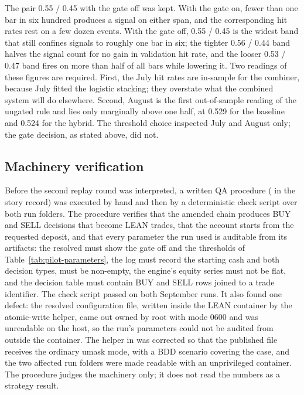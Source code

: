 The pair 0.55 / 0.45 with the gate off was kept. With the gate on, fewer than one bar in six hundred produces a signal on either span, and the corresponding hit rates rest on a few dozen events. With the gate off, 0.55 / 0.45 is the widest band that still confines signals to roughly one bar in six; the tighter 0.56 / 0.44 band halves the signal count for no gain in validation hit rate, and the looser 0.53 / 0.47 band fires on more than half of all bars while lowering it. Two readings of these figures are required. First, the July hit rates are in-sample for the combiner, because July fitted the logistic stacking; they overstate what the combined system will do elsewhere. Second, August is the first out-of-sample reading of the ungated rule and lies only marginally above one half, at 0.529 for the baseline and 0.524 for the hybrid. The threshold choice inspected July and August only; the gate decision, as stated above, did not.

\subsection{Machinery verification} \label{subsec:machinery-verification}

Before the second replay round was interpreted, a written QA procedure ( in the story record) was executed by hand and then by a deterministic check script over both run folders. The procedure verifies that the amended chain produces BUY and SELL decisions that become LEAN trades, that the account starts from the requested deposit, and that every parameter the run used is auditable from its artifacts: the resolved  must show the gate off and the thresholds of Table~\ref{tab:pilot-parameters}, the log must record the starting cash and both decision types,  must be non-empty, the engine's equity series must not be flat, and the decision table must contain BUY and SELL rows joined to a trade identifier. The check script passed on both September runs. It also found one defect: the resolved configuration file, written inside the LEAN container by the atomic-write helper, came out owned by root with mode 0600 and was unreadable on the host, so the run's parameters could not be audited from outside the container. The helper in  was corrected so that the published file receives the ordinary umask mode, with a BDD scenario covering the case, and the two affected run folders were made readable with an unprivileged container. The procedure judges the machinery only; it does not read the numbers as a strategy result.


